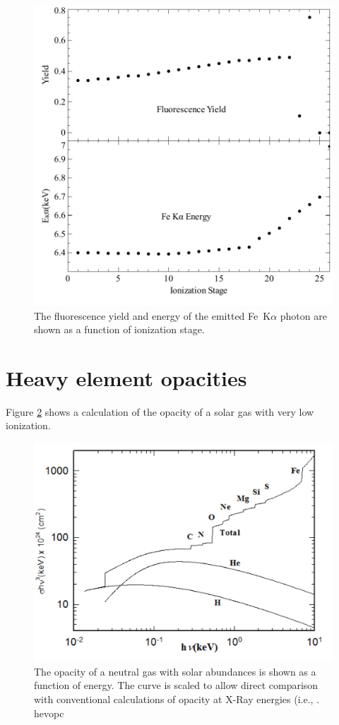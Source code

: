 \begin{figure}
\centering
\label{fig:FeKalpha}
\includegraphics[scale=0.8]{FeKalpha}
\caption[Fe~K$\alpha$ yield and energy]{The fluorescence yield and energy of the emitted Fe~K$\alpha$ photon
are shown as a function of ionization stage.}
\end{figure}

\section{Heavy element opacities}

Figure \ref{fig:GasOpacity} shows a calculation of the opacity of a solar gas with very
low ionization.

\begin{figure}
\centering
\label{fig:GasOpacity}
\includegraphics[scale=0.7]{GasOpacity}
\caption[Atomic gas opacity]{The opacity of a neutral gas with solar abundances is shown
as a function of energy.  The curve is scaled to allow direct comparison
with conventional calculations of opacity at X-Ray energies (i.e., \citet{Morrison1983}. hevopc}
\end{figure}

